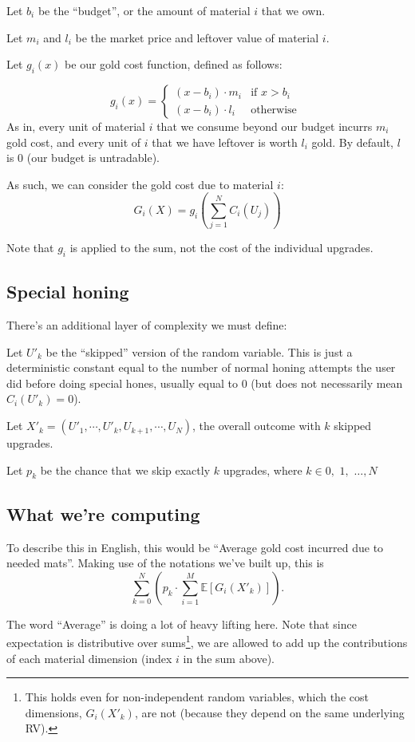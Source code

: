 \documentclass[a4paper,11pt]{article}
\begin{document}
Let $b_i$ be the ``budget'', or the amount of material $i$ that we own.

Let $m_i$ and $l_i$ be the market price and leftover value of material $i$.

Let $g_i(x)$ be our gold cost function, defined as follows:

$$
g_i(x) =  \begin{cases}
  (x - b_i) \cdot   m_i  & \text{if } x > b_i \\
     (x - b_i) \cdot   l_i& \text{otherwise }
\end{cases}
$$
As in, every unit of material $i$ that we consume beyond our budget incurrs $m_i$ gold cost, and every unit of $i$ that we have leftover is worth $l_i$ gold.  By default, $l$ is 0 (our budget is untradable). 

As such, we can consider the gold cost due to material $i$:
$$
G_i(X) = g_i ( \sum^N_{j=1}C_i(U_j))
$$

Note that $g_i$ is applied to the sum, not the cost of the individual upgrades.

\subsection{Special honing}

There's an additional layer of complexity we must define:

Let $U'_k$ be the ``skipped'' version of the random variable. This is just a deterministic constant equal to the number of normal honing attempts the user did before doing special hones, usually equal to 0 (but does not necessarily mean $C_i(U'_k) = 0$).

Let $X'_k = (U'_1,\cdots , U'_k, U_{k+1}, \cdots, U_N)$, the overall outcome with $k$ skipped upgrades.

Let $p_k$ be the chance that we skip exactly $k$ upgrades, where $k \in 0,$ $1,$ $\ldots, N$

\subsection{What we're computing}

To describe this in English, this would be ``Average gold cost incurred due to needed mats''. Making use of the notations we've built up, this is
$$
\sum^N_{k=0} (p_k  \cdot \sum^M_{i=1}  \mathbb{E}[  G_i(X'_k)  ]).
$$

 The word ``Average'' is doing a lot of heavy lifting here. Note that since expectation is distributive over sums\footnote{This holds even for non-independent random variables, which the cost dimensions, $G_i(X'_k)$, are not (because they depend on the same underlying RV). }, we are allowed to add up the contributions of each material dimension (index $i$ in the sum above). 
 
\end{document}

